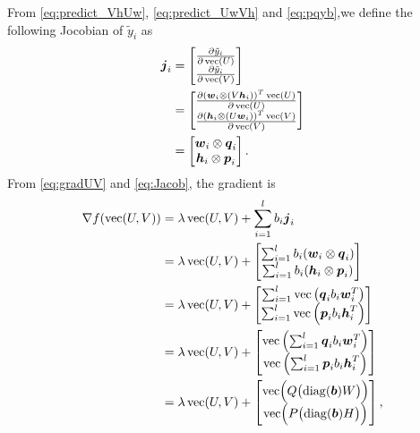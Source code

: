 From \eqref{eq:predict_VhUw}, \eqref{eq:predict_UwVh} and \eqref{eq:pqyb},we define the following Jocobian of $\tilde{y}_i$ as
\begin {align}
\boldsymbol{j}_i &= \begin{bmatrix} \frac{\partial \tilde{y}_i}{\partial \operatorname*{vec}(U)} \\ \frac{\partial \tilde{y}_i}{\partial \operatorname*{vec}(V)} \end{bmatrix}\nonumber \\
&= \begin{bmatrix} \frac{\partial (\boldsymbol{w}_i \otimes (V \boldsymbol{h}_i))^T\operatorname*{vec}(U)}{\partial \operatorname*{vec}(U)} \\ \frac{\partial (\boldsymbol{h}_i \otimes (U \boldsymbol{w}_i))^T\operatorname*{vec}(V)}{\partial \operatorname*{vec}(V)} \end{bmatrix}\nonumber \\
&= \begin{bmatrix} \boldsymbol{w}_i\otimes \boldsymbol{q}_i \\ \boldsymbol{h}_i\otimes \boldsymbol{p}_i \end{bmatrix}
\label{eq:Jacob}.
\end{align}
From \eqref{eq:gradUV} and \eqref{eq:Jacob}, the gradient is
\begin {align}
\nabla {f}(\operatorname*{vec}(U, V)) 
&= \lambda \operatorname*{vec}(U,V) + \sum_{i=1}^l b_i \boldsymbol{j}_i\nonumber\\
&= \lambda \operatorname*{vec}(U,V) + \begin{bmatrix} \sum_{i=1}^l b_i (\boldsymbol{w}_i\otimes\boldsymbol{q}_i) \\ \sum_{i=1}^l b_i (\boldsymbol{h}_i\otimes\boldsymbol{p}_i)\end{bmatrix}\label{eq:GradU_K1}\\
&= \lambda \operatorname*{vec}(U,V) + \begin{bmatrix} \sum_{i=1}^l \operatorname*{vec}\left(\boldsymbol{q}_i b_i \boldsymbol{w}_i^T \right) \\ \sum_{i=1}^l \operatorname*{vec}\left(\boldsymbol{p}_i b_i \boldsymbol{h}_i^T \right)\end{bmatrix}\label{eq:GradU_K2}\\
&= \lambda \operatorname*{vec}(U,V) + \begin{bmatrix} \operatorname*{vec}\left( \sum_{i=1}^l \boldsymbol{q}_i b_i \boldsymbol{w}_i^T \right) \\ \operatorname*{vec}\left( \sum_{i=1}^l \boldsymbol{p}_i b_i \boldsymbol{h}_i^T \right)\end{bmatrix}\nonumber\\
&= \lambda \operatorname*{vec}(U,V) + \begin{bmatrix} \operatorname*{vec} \Bigl ( Q \bigl(\operatorname*{diag}(\boldsymbol{b}) W \bigr)  \Bigr) \\ \operatorname*{vec} \Bigl ( P \bigl(\operatorname*{diag}(\boldsymbol{b}) H \bigr)  \Bigr)\end{bmatrix}
\label{eq:Grad},
\end{align}
